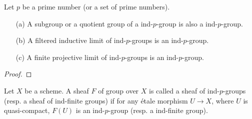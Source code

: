 \begin{proposition}\label{scheme etale topos ind p-group prop}
Let $p$ be a prime number (or a set of prime numbers).
\begin{enumerate}
    \item[(a)] A subgroup or a quotient group of a ind-$p$-group is also a ind-$p$-group.
    \item[(b)] A filtered inductive limit of ind-$p$-groups is an ind-$p$-group.
    \item[(c)] A finite projective limit of ind-$p$-groups is an ind-$p$-group.
\end{enumerate}
\end{proposition}
\begin{proof}

\end{proof}

\begin{definition}
Let $X$ be a scheme. A sheaf $F$ of group over $X$ is called a sheaf of ind-$p$-groups (resp. a sheaf of ind-finite groups) if for any \'etale morphism $U\to X$, where $U$ is quasi-compact, $F(U)$ is an ind-$p$-group (resp. a ind-finite group).
\end{definition}

